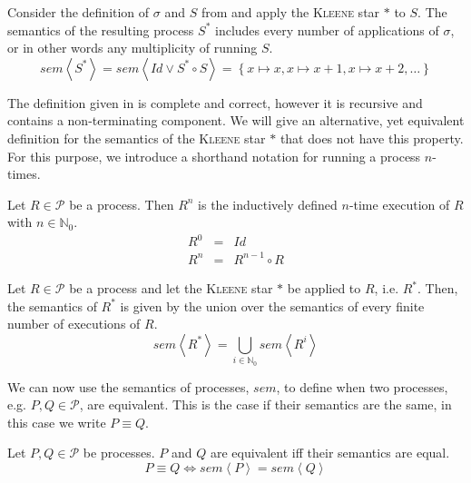 \begin{example}
Consider the definition of $\sigma$ and $S$ from  and apply the \textsc{Kleene} star $*$ to $S$. The semantics of the resulting process $S^*$ includes every number of applications of $\sigma$, or in other words any multiplicity of running $S$.
  \begin{equation}
    sem \left\langle S^* \right\rangle = sem \left\langle Id \vee S^* \circ S \right\rangle = \left\{ x \mapsto x, x \mapsto x+1, x \mapsto x+2, \ldots \right\}
  \end{equation}
  \hfill\qedsymbol
\end{example}

The definition given in  is complete and correct, however it is recursive and contains a non-terminating component. We will give an alternative, yet equivalent definition for the semantics of the \textsc{Kleene} star $*$ that does not have this property. For this purpose, we introduce a shorthand notation for running a process $n$-times.
\begin{definition}
\label{def:multiple_execution}
Let $R \in \mathcal{P}$ be a process. Then $R^n$ is the inductively defined $n$-time execution of $R$ with $n \in \mathbb{N}_0$.
  \begin{eqnarray}
    \label{eqn:multiple_execution}
    R^0 & = & Id \\
    R^n & = & R^{n-1} \circ R 
  \end{eqnarray}
  \hfill\qedsymbol
\end{definition}

\begin{definition}
\label{def:sem_kleene_alternative}
  Let $R \in \mathcal{P}$ be a process and let the \textsc{Kleene} star $*$ be applied to $R$, i.e. $R^*$. Then, the semantics of $R^*$ is given by the union over the semantics of every finite number of executions of $R$.
  \begin{equation}
    \label{eqn:sem_kleene_alternative}
    sem \left\langle R^* \right\rangle = \bigcup_{i \in \mathbb{N}_0} sem \left\langle R^i \right\rangle
  \end{equation}
  \hfill\qedsymbol
\end{definition}


We can now use the semantics of processes, $sem$, to define when two processes, e.g. $P, Q \in \mathcal{P}$, are equivalent. This is the case if their semantics are the same, in this case we write $P \equiv Q$.
\begin{definition}
Let $P, Q \in \mathcal{P}$ be processes. $P$ and $Q$ are equivalent iff their semantics are equal.
  \begin{equation}
    \label{eqn:equivalence}
    P \equiv Q \Leftrightarrow sem \left\langle P \right\rangle = sem \left\langle Q \right\rangle
  \end{equation}
  \hfill\qedsymbol
\end{definition}

